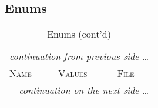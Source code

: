 \subsection{Enums}
\begin{tiny}
\begin{longtable}[ht]{|p{0.225\tablwidth}|p{0.375\tablwidth}|p{0.3\tablwidth}|}
  \caption[Enums]{Enums}
  \label{table_(defines_enums_typedef):enums} \\
  \hline
  \endfirsthead
  \caption[Enums (cont'd)]{Enums (cont'd)} \\
  \hline
  \multicolumn{3}{l}{\textsl{continuation from previous side \ldots}} \\
  \hline \cellcolor{tablefirstrowcolor} \textsc{Name} & \cellcolor{tablefirstrowcolor} \textsc{Values} & \cellcolor{tablefirstrowcolor} \textsc{File} \\
  \hline
  \endhead
  \hline
  \multicolumn{3}{r}{\textsl{continuation on the next side \ldots}} \\
  \hline
  \endfoot
  \hline
  \endlastfoot


\end{longtable}
\end{tiny}
